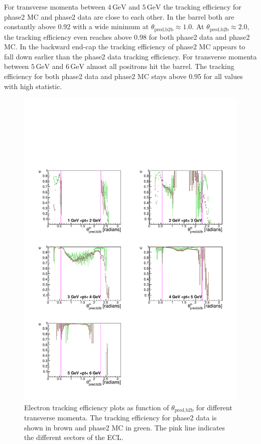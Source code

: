\documentclass[a4paper,11pt,twosided,final,german,openbib,pdftex,listof=totoc,bibliography=totoc]{scrbook}
\begin{document}
For transverse momenta between $4\,\textrm{GeV}$  and $5\,\textrm{GeV}$ the tracking efficiency for phase2 MC and phase2 data are close to each other. In the barrel both are constantly above 0.92 with a wide minimum at $\theta_{\textrm{pred,b2b}} \approx 1.0$. At $\theta_{\textrm{pred,b2b}} \approx 2.0$, the tracking efficiency even reaches above 0.98 for both phase2 data and phase2 MC. In the backward end-cap the tracking efficiency of phase2 MC appears to fall down earlier than the phase2 data tracking efficiency.
For transverse momenta between $5\,\textrm{GeV}$ and $6\,\textrm{GeV}$ almost all positrons hit the barrel. The tracking efficiency for both phase2 data and phase2 MC stays above 0.95 for all values with high statistic.

\begin{figure}[!htbp]
	\centering
	\includegraphics[width=\textwidth]{Plots/master/xPtMThetaem}
	\caption[Transverse Momentum $\theta_{\textrm{pred,b2b}}$ Electron Efficiency Phase2]{Electron tracking efficiency plots as function of $\theta_{\textrm{pred,b2b}}$ for different transverse momenta. The tracking efficiency for phase2 data is shown in brown and phase2 MC in green. The pink line indicates the different sectors of the ECL.}
	\label{plt:xPtMThetaem}
\end{figure}
\end{document}
